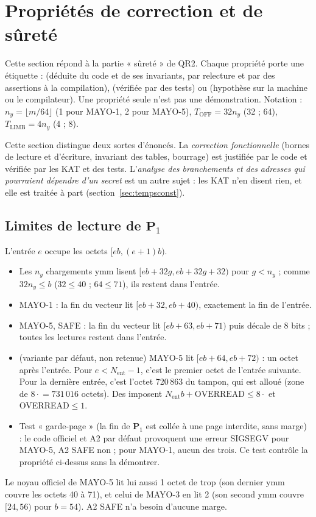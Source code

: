 \section{Propriétés de correction et de sûreté}\label{sec:surete}
Cette section répond à la partie « sûreté » de QR2. Chaque propriété porte une étiquette : \Pc{} (déduite du code et de ses invariants, par relecture et par des assertions à la compilation), \Pe{} (vérifiée par des tests) ou \Hy{} (hypothèse sur la machine ou le compilateur). Une propriété \Pe{} seule n'est pas une démonstration. Notation : $n_y=\lfloor m/64\rfloor$ (1 pour MAYO-1, 2 pour MAYO-5), $T_{\mathrm{OFF}}=32n_y$ (32 ; 64), $T_{\mathrm{LIMB}}=4n_y$ (4 ; 8).

Cette section distingue deux sortes d'énoncés. La \emph{correction fonctionnelle} (bornes de lecture et d'écriture, invariant des tables, bourrage) est justifiée par le code et vérifiée par les KAT et des tests. L'\emph{analyse des branchements et des adresses qui pourraient dépendre d'un secret} est un autre sujet : les KAT n'en disent rien, et elle est traitée à part (section~\ref{sec:tempsconst}).

\subsection{Limites de lecture de $\mathbf{P}_1$}
L'entrée $e$ occupe les octets $[eb,(e+1)b)$.
\begin{itemize}
\item \Pc{} Les $n_y$ chargements ymm lisent $[eb+32g,eb+32g+32)$ pour $g<n_y$ ; comme $32n_y\le b$ ($32\le40$ ; $64\le71$), ils restent dans l'entrée.
\item \Pc{} MAYO-1 : la fin du vecteur lit $[eb+32,eb+40)$, exactement la fin de l'entrée.
\item \Pc{} MAYO-5, SAFE : la fin du vecteur lit $[eb+63,eb+71)$ puis décale de 8 bits ; toutes les lectures restent dans l'entrée.
\item \Pc{} (variante par défaut, non retenue) MAYO-5 lit $[eb+64,eb+72)$ : un octet après l'entrée. Pour $e<N_{\mathrm{ent}}-1$, c'est le premier octet de l'entrée suivante. Pour la dernière entrée, c'est l'octet 720\,863 du tampon, qui est alloué (zone de $8\cdot$$=731\,016$ octets). Des  imposent $N_{\mathrm{ent}}b+\text{OVERREAD}\le8\cdot$ et OVERREAD$\le1$.
\item \Pe{} Test « garde-page » (la fin de $\mathbf{P}_1$ est collée à une page interdite, sans marge) : le code officiel et A2 par défaut provoquent une erreur SIGSEGV pour MAYO-5, A2 SAFE non ; pour MAYO-1, aucun des trois. Ce test contrôle la propriété ci-dessus sans la démontrer.
\end{itemize}
Le noyau officiel de MAYO-5 lit lui aussi 1 octet de trop (son dernier ymm couvre les octets 40 à 71), et celui de MAYO-3 en lit 2 (son second ymm couvre $[24,56)$ pour $b=54$). A2 SAFE n'a besoin d'aucune marge.

